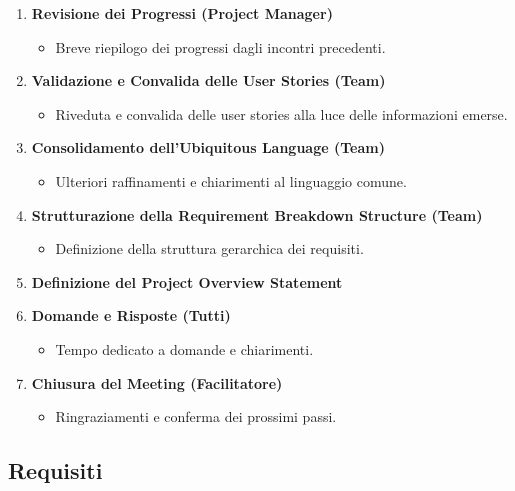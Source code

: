 \begin{enumerate}
    \item \textbf{Revisione dei Progressi (Project Manager)}
          \begin{itemize}
              \item Breve riepilogo dei progressi dagli incontri precedenti.
          \end{itemize}

    \item \textbf{Validazione e Convalida delle User Stories (Team)}
          \begin{itemize}
              \item Riveduta e convalida delle user stories alla luce delle informazioni emerse.
          \end{itemize}

    \item \textbf{Consolidamento dell'Ubiquitous Language (Team)}
          \begin{itemize}
              \item Ulteriori raffinamenti e chiarimenti al linguaggio comune.
          \end{itemize}

    \item \textbf{Strutturazione della Requirement Breakdown Structure (Team)}
          \begin{itemize}
              \item Definizione della struttura gerarchica dei requisiti.
          \end{itemize}

    \item \textbf{Definizione del Project Overview Statement}

    \item \textbf{Domande e Risposte (Tutti)}
          \begin{itemize}
              \item Tempo dedicato a domande e chiarimenti.
          \end{itemize}

    \item \textbf{Chiusura del Meeting (Facilitatore)}
          \begin{itemize}
              \item Ringraziamenti e conferma dei prossimi passi.
          \end{itemize}
\end{enumerate}

\subsection{Requisiti}

